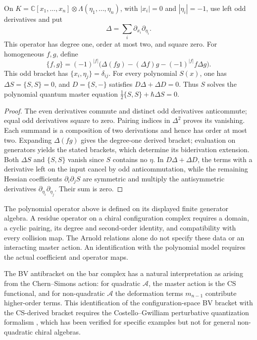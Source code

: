 \begin{proposition}
\label{prop:cbc26-polynomial-laplacian}
On $K=\mathbb C[x_1,\ldots,x_n]\otimes\Lambda(\eta_1,\ldots,\eta_n)$, with $|x_i|=0$ and $|\eta_i|=-1$, use left odd derivatives and put
\[
 \Delta=\sum_i\partial_{x_i}\partial_{\eta_i}.
\]
This operator has degree one, order at most two, and square zero.
For homogeneous $f,g$, define
\[
 \{f,g\}=(-1)^{|f|}\bigl(\Delta(fg)-(\Delta f)g-(-1)^{|f|}f\Delta g\bigr).
\]
This odd bracket has $\{x_i,\eta_j\}=\delta_{ij}$.
For every polynomial $S(x)$, one has $\Delta S=\{S,S\}=0$, and $D=\{S,-\}$ satisfies $D\Delta+\Delta D=0$.
Thus $S$ solves the polynomial quantum master equation $\tfrac12\{S,S\}+\hbar\Delta S=0$.
\end{proposition}
\begin{proof}
The even derivatives commute and distinct odd derivatives anticommute; equal odd derivatives square to zero.
Pairing indices in $\Delta^2$ proves its vanishing.
Each summand is a composition of two derivations and hence has order at most two.
Expanding $\Delta(fg)$ gives the degree-one derived bracket; evaluation on generators yields the stated brackets, which determine its biderivation extension.
Both $\Delta S$ and $\{S,S\}$ vanish since $S$ contains no $\eta$.
In $D\Delta+\Delta D$, the terms with a derivative left on the input cancel by odd anticommutation, while the remaining Hessian coefficients $\partial_i\partial_jS$ are symmetric and multiply the antisymmetric derivatives $\partial_{\eta_i}\partial_{\eta_j}$.
Their sum is zero.
\end{proof}

\begin{remark}\label{thm:bv-structure-bar}
The polynomial operator above is defined on its displayed finite generator algebra.
A residue operator on a chiral configuration complex requires a domain, a cyclic pairing, its degree and second-order identity, and compatibility with every collision map.
The Arnold relations alone do not specify these data or an interacting master action.
An identification with the polynomial model requires the actual coefficient and operator maps.
\end{remark}

\begin{remark}\label{rem:cs-interp}
The BV antibracket on the bar complex has a natural interpretation as
arising from the Chern--Simons action: for quadratic $\mathcal{A}$,
the master action is the CS functional, and for non-quadratic
$\mathcal{A}$ the deformation terms $m_{n-1}$ contribute higher-order
terms.  This identification of the configuration-space BV bracket with the
CS-derived bracket requires the Costello--Gwilliam perturbative
quantization formalism \cite{CG17}, which has been verified for specific
examples but not for general non-quadratic chiral algebras.
\end{remark}

